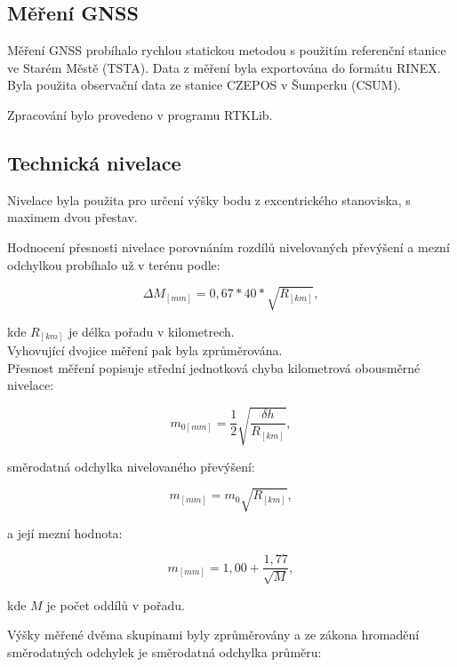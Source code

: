 
\subsection{Měření GNSS}

\tab Měření GNSS probíhalo rychlou statickou metodou s použitím referenční stanice ve Starém Městě (TSTA). Data z měření byla exportována do formátu RINEX. Byla použita observační data ze stanice CZEPOS v Šumperku (CSUM).

Zpracování bylo provedeno v programu RTKLib. 

\subsection{Technická nivelace}

\tab Nivelace byla použita pro určení výšky bodu z excentrického stanoviska, s maximem dvou přestav.

Hodnocení přesnosti nivelace porovnáním rozdílů nivelovaných převýšení a mezní odchylkou probíhalo už v terénu podle:

\begin{equation}
    \Delta M_{[mm]}=0,67*40*\sqrt{R_{[km]}},
\end{equation}

kde $R_{[km]}$ je délka pořadu v kilometrech.\\

Vyhovující dvojice měření pak byla zprůměrována.\\

Přesnost měření popisuje střední jednotková chyba kilometrová obousměrné nivelace:

\begin{equation}
    m_{0[mm]}=\frac{1}{2}\sqrt{\frac{\delta h}{R_{[km]}}},
\end{equation}

směrodatná odchylka nivelovaného převýšení:

\begin{equation}
    m_{[mm]}=m_0\sqrt{R_{[km]}},
\end{equation}

a její mezní hodnota:

\begin{equation}
    m_{[mm]}=1,00 + \frac{1,77}{\sqrt{M}},
\end{equation}

kde $M$ je počet oddílů v pořadu.

Výšky měřené dvěma skupinami byly zprůměrovány a ze zákona hromadění směrodatných odchylek je směrodatná odchylka průměru:

